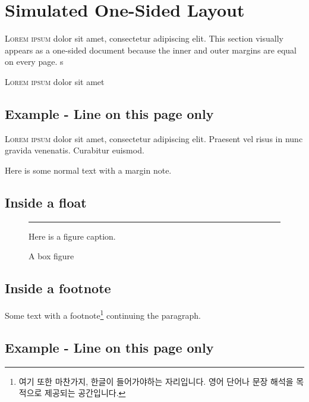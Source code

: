 \documentclass[12pt]{book}
\begin{document}
  

  
  \chapter{Simulated One-Sided Layout}
  \lettrine{L}{orem ipsum} dolor sit amet, consectetur adipiscing elit. 
  This section visually appears as a one-sided document because the inner and 
  outer margins are equal on every page. s
  \lipsum[1-2]

  \lettrine{L}{orem ipsum} dolor sit amet \lipsum[1-2]



  \section*{Example - Line on this page only}

  \lettrine[lines=3]{L}{orem ipsum} dolor sit amet, consectetur adipiscing elit. 
  Praesent vel risus in nunc gravida venenatis. Curabitur euismod.
  \lipsum[1-2]


  Here is some normal text with a margin note.

  \section{Inside a float}

  \begin{figure}[ht]
    \centering
    \rule{3cm}{2cm}
    \caption{A box figure}
    Here is a figure caption. 
  \end{figure}

  \section{Inside a footnote}

  Some text with a footnote\footnote{
    여기 또한 마찬가지, 한글이 들어가야하는 자리입니다. 영어 단어나 문장 해석을 목적으로 제공되는 공간입니다.
  } continuing the paragraph.






  \newpage
  \section*{Example - Line on this page only}
\end{document}

